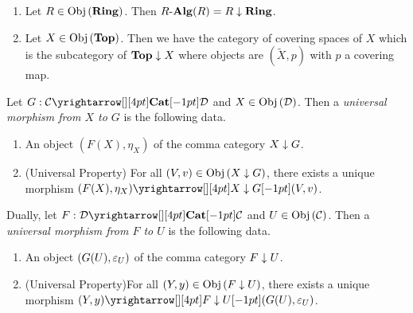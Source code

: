 \begin{eg}
  \begin{enumerate}
    \item Let $R\in\mathrm{Obj}\left(\mathbf{Ring}\right)$. Then $R\text{-}\mathbf{Alg}(R) = R\downarrow\mathbf{Ring}$.
    \item Let $X\in\mathrm{Obj}\left(\mathbf{Top}\right)$. Then we have the category of covering spaces 
    of $X$ which is the subcategory of $\mathbf{Top}\downarrow X$ where 
    objects are $(\tilde{X},p)$ with $p$ a covering map.
  \end{enumerate}
\end{eg}

\begin{dfn}\hypertarget{universal}{}
  
  Let $G : \map{\CC}{\DD}{\CAT}{}$ and $X \in \mathrm{Obj}\left(\mathcal{D}\right)$.
  Then a \emph{universal morphism from $X$ to $G$} is the following data. 
  \begin{enumerate}
    \item An object $(F(X),\eta_X)$ of the comma category $X\downarrow G$.
    \item (Universal Property) For all $(V,v) \in \mathrm{Obj}\left(X\downarrow G\right)$,
    there exists a unique morphism $\map{(F(X),\eta_X)}{(V,v)}{X\darrow G}{}$.
  \end{enumerate}

  Dually, let $F : \map{\DD}{\CC}{\CAT}{}$ and $U \in \mathrm{Obj}\left(\mathcal{C}\right)$.
  Then a \emph{universal morphism from $F$ to $U$} is the following data. 
  \begin{enumerate}
    \item An object $(G(U),\varepsilon_U)$ of the comma category $F\downarrow U$.
    \item (Universal Property)For all $(Y,y) \in \mathrm{Obj}\left(F\downarrow U\right)$,
    there exists a unique morphism $\map{(Y,y)}{(G(U),\ep_U)}{F\darrow U}{}$.
  \end{enumerate}
\end{dfn}

